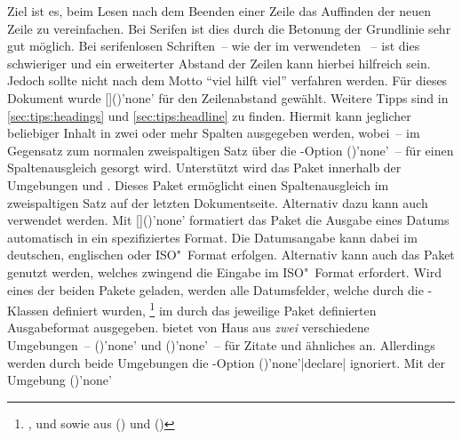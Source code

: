 \begin{DeclarePackages}[Typografie]
  Ziel ist es, beim Lesen nach dem Beenden einer Zeile das Auffinden der neuen 
  Zeile zu vereinfachen. Bei Serifen ist dies durch die Betonung der Grundlinie 
  sehr gut möglich. Bei serifenlosen Schriften~-- wie der im \TUDCD verwendeten 
  \OpenSans~-- ist dies schwieriger und ein erweiterter Abstand der Zeilen kann 
  hierbei hilfreich sein. Jedoch sollte nicht nach dem Motto 
  \enquote{viel hilft viel} verfahren werden. Für dieses Dokument wurde 
  []()'none' für den 
  Zeilenabstand gewählt. Weitere Tipps sind in \autoref{sec:tips:headings} und 
  \autoref{sec:tips:headline} zu finden.
  Hiermit kann jeglicher beliebiger Inhalt in zwei oder mehr Spalten ausgegeben 
  werden, wobei~-- im Gegensatz zum normalen zweispaltigen Satz über die
  \KOMAScript-Option ()'none'~-- für einen 
  Spaltenausgleich gesorgt wird. Unterstützt wird das Paket innerhalb der 
  Umgebungen  und .
  Dieses Paket ermöglicht einen Spaltenausgleich im zweispaltigen Satz auf der 
  letzten Dokumentseite. Alternativ dazu kann auch  verwendet 
  werden.
  Mit []()'none' formatiert 
  das Paket  die Ausgabe eines Datums automatisch in ein
  spezifiziertes Format. Die Datumsangabe kann dabei im deutschen, englischen 
  oder ISO"~Format erfolgen. Alternativ kann auch das Paket 
  genutzt werden, welches zwingend die Eingabe im ISO"~Format erfordert. Wird
  eines der beiden Pakete geladen, werden alle Datumsfelder, welche durch die 
  \TUDScript-Klassen definiert wurden,%
  \footnote{%
    ,  und  sowie aus 
     () und 
    ()%
  }
  im durch das jeweilige Paket definierten Ausgabeformat ausgegeben.
   bietet von Haus aus \emph{zwei} verschiedene Umgebungen~-- 
  ()'none' und 
  ()'none'~-- für Zitate und 
  ähnliches an. Allerdings werden durch beide Umgebungen die \KOMAScript-Option 
  ()'none'|declare|
  ignoriert. Mit der Umgebung ()'none'

\end{DeclarePackages}
